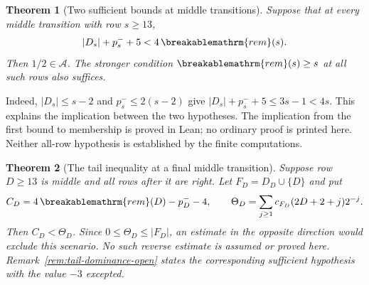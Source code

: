 \documentclass[11pt]{article}
\theoremstyle{plain}
\newtheorem{thm}{Theorem}[section]
\theoremstyle{definition}
\theoremstyle{remark}
\renewcommand{\mathrm}[1]{\ifmmode\breakablemathrm{#1}\else\textrm{#1}\fi}%
\begin{document}
\begin{thm}[Two sufficient bounds at middle transitions]
\label{thm:middle-producer-escape}
Suppose that at every middle transition with row $s\ge13$,
\[
 |D_s|+p_s^-+5<4\,\mathrm{rem}(s).
\]
Then $1/2\in\mathcal A$.  The stronger condition
$\mathrm{rem}(s)\ge s$ at all such rows also suffices.
\end{thm}
Indeed, $|D_s|\le s-2$ and $p_s^-\le2(s-2)$ give
$|D_s|+p_s^-+5\le3s-1<4s$.  This explains the implication
between the two hypotheses.  The implication from the first bound to
membership is proved in Lean; no ordinary proof is printed here.  Neither all-row hypothesis
is established by the finite computations.

\begin{thm}[The tail inequality at a final middle transition]
\label{thm:middle-allright-defect}
Suppose row $D\ge13$ is middle and all rows after it are right.
Let $F_D=D_D\cup\{D\}$ and put
\[
 C_D=4\,\mathrm{rem}(D)-p_D^--4,\qquad
 \Theta_D=\sum_{j\ge1}c_{F_D}(2D+2+j)2^{-j}.
\]
Then $C_D<\Theta_D$.  Since $0\le\Theta_D\le|F_D|$,
an estimate in the opposite direction would exclude this scenario.
No such reverse estimate is assumed or proved here.
Remark~\ref{rem:tail-dominance-open} states the corresponding sufficient
hypothesis with the value $-3$ excepted.
\end{thm}
\end{document}
